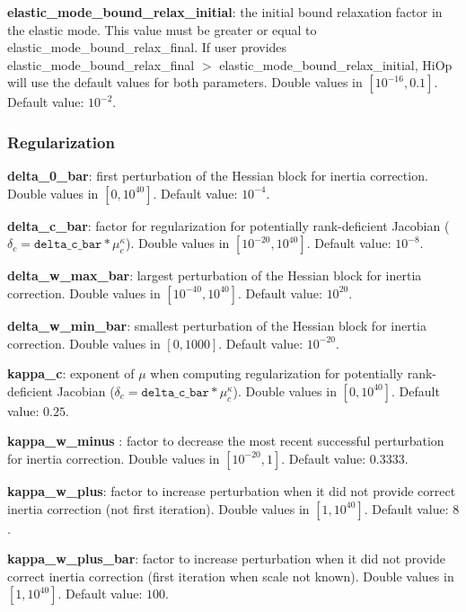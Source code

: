 \noindent \textbf{elastic\_mode\_bound\_relax\_initial}: the initial bound relaxation factor in the elastic mode. This value must be greater or equal to elastic\_mode\_bound\_relax\_final. If user provides elastic\_mode\_bound\_relax\_final $>$ elastic\_mode\_bound\_relax\_initial, HiOp will use the default values for both parameters. Double values in $[10^{-16}, 0.1]$. Default value: $10^{-2}$.
\medskip



\subsubsection{Regularization}

\noindent \textbf{delta\_0\_bar}: first perturbation of the Hessian block for inertia correction. Double values in $[0,10^{40}]$. Default value: $10^{-4}$. 
\medskip

\noindent \textbf{delta\_c\_bar}: factor for regularization for potentially rank-deficient Jacobian ($\delta_c=\texttt{delta\_c\_bar}*\mu^\kappa_c$). Double values in $[10^{-20},10^{40}]$. Default value: $10^{-8}$. 
\medskip

\noindent \textbf{delta\_w\_max\_bar}: largest perturbation of the Hessian block for inertia correction. Double values in $[10^{-40},10^{40}]$. Default value: $10^{20}$. 
\medskip

\noindent \textbf{delta\_w\_min\_bar}: smallest perturbation of the Hessian block for inertia correction. Double values in $[0,1000]$. Default value: $10^{-20}$. 
\medskip

\noindent \textbf{kappa\_c}: exponent of $\mu$ when computing regularization for potentially rank-deficient Jacobian ($\delta_c=\texttt{delta\_c\_bar}*\mu^\kappa_c$). Double values in $[0,10^{40}]$. Default value: $0.25$. 
\medskip

\noindent \textbf{kappa\_w\_minus }: factor to decrease the most recent successful perturbation for inertia correction. Double values in $[10^{-20}, 1]$. Default value: $0.3333$.
\medskip

\noindent \textbf{kappa\_w\_plus}: factor to increase perturbation when it did not provide correct inertia correction (not first iteration). Double values in $[1, 10^{40}]$. Default value: $8$.
\medskip

\noindent \textbf{kappa\_w\_plus\_bar}: factor to increase perturbation when it did not provide correct inertia correction (first iteration when scale not known). Double values in $[1, 10^{40}]$. Default value: $100$.
\medskip

